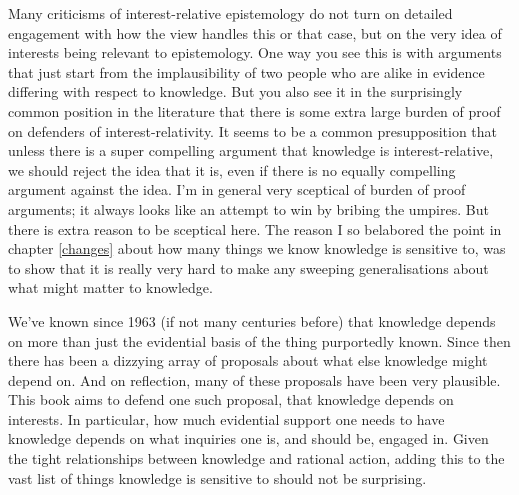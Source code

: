 \documentclass[
  11pt,
]{book}
\begin{document}
Many criticisms of interest-relative epistemology do not turn on detailed engagement with how the view handles this or that case, but on the very idea of interests being relevant to epistemology. One way you see this is with arguments that just start from the implausibility of two people who are alike in evidence differing with respect to knowledge. But you also see it in the surprisingly common position in the literature that there is some extra large burden of proof on defenders of interest-relativity. It seems to be a common presupposition that unless there is a super compelling argument that knowledge is interest-relative, we should reject the idea that it is, even if there is no equally compelling argument against the idea. I'm in general very sceptical of burden of proof arguments; it always looks like an attempt to win by bribing the umpires. But there is extra reason to be sceptical here. The reason I so belabored the point in chapter \ref{changes} about how many things we know knowledge is sensitive to, was to show that it is really very hard to make any sweeping generalisations about what might matter to knowledge.

We've known since 1963 (if not many centuries before) that knowledge depends on more than just the evidential basis of the thing purportedly known. Since then there has been a dizzying array of proposals about what else knowledge might depend on. And on reflection, many of these proposals have been very plausible. This book aims to defend one such proposal, that knowledge depends on interests. In particular, how much evidential support one needs to have knowledge depends on what inquiries one is, and should be, engaged in. Given the tight relationships between knowledge and rational action, adding this to the vast list of things knowledge is sensitive to should not be surprising.

\fancyhf{}
\fancyhead[R]{\thepage}

  
\end{document}

